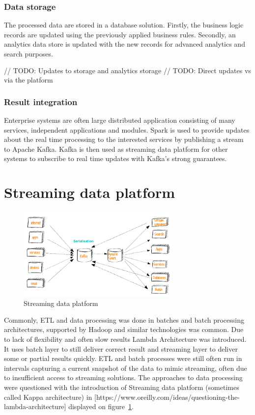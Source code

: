 \documentclass[a4paper, 10 pt, conference]{IEEEtran}
\begin{document}
\subsubsection{Data storage}
The processed data are stored in a database solution. Firstly, the business logic records are updated using the previously applied business rules. Secondly, an analytics data store is updated with the new records for advanced analytics and search purposes. 

// TODO: Updates to storage and analytics storage
// TODO: Direct updates vs via the platform

\subsubsection{Result integration}
Enterprise systems are often large distributed application consisting of many services, independent applications and modules. Spark is used to provide updates about the real time processing to the interested services by publishing a stream to Apache Kafka. Kafka is then used as streaming data platform for other systems to subscribe to real time updates with Kafka's strong guarantees.

\section{Streaming data platform}

\begin{figure}[hb]
	\begin{center}
		\caption{Streaming data platform}
		\label{fig:streamingDataPlatform}
		\includegraphics[width=8cm,keepaspectratio]{streaming-data-platform.png}
	\end{center}
\end{figure}

Commonly, ETL and data processing was done in batches and batch processing architectures, supported by Hadoop and similar technologies was common. Due to lack of flexibility and often slow results Lambda Architecture was introduced. It uses batch layer to still deliver correct result and streaming layer to deliver some or partial results quickly.
ETL and batch processes were still often run in intervals capturing a current snapshot of the data to mimic streaming, often due to insufficient access to streaming solutions. The approaches to data processing were questioned with the introduction of Streaming data platform (sometimes called Kappa architecture) in [https://www.oreilly.com/ideas/questioning-the-lambda-architecture] displayed on figure~\ref{fig:streamingDataPlatform}.
\end{document}
